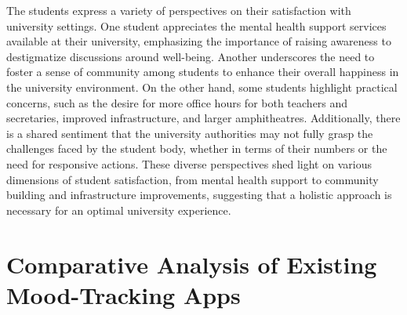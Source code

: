 \documentclass[11pt]{report}
\begin{document}
The students express a variety of perspectives on their satisfaction with university settings. One student appreciates the mental health support services available at their university, emphasizing the importance of raising awareness to destigmatize discussions around well-being. Another underscores the need to foster a sense of community among students to enhance their overall happiness in the university environment. On the other hand, some students highlight practical concerns, such as the desire for more office hours for both teachers and secretaries, improved infrastructure, and larger amphitheatres. Additionally, there is a shared sentiment that the university authorities may not fully grasp the challenges faced by the student body, whether in terms of their numbers or the need for responsive actions. These diverse perspectives shed light on various dimensions of student satisfaction, from mental health support to community building and infrastructure improvements, suggesting that a holistic approach is necessary for an optimal university experience.

\section{Comparative Analysis of Existing Mood-Tracking Apps}
\end{document}
